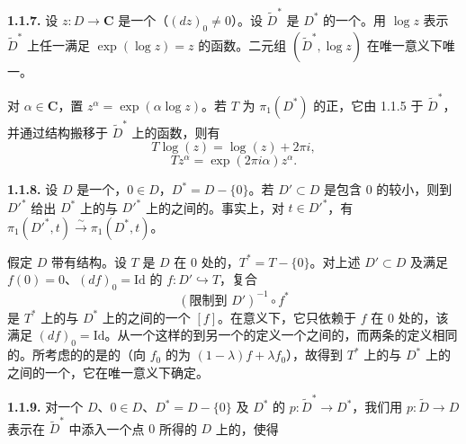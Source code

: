 \textbf{1.1.7.} 设 $z:D\to\mathbf C$ 是一个（$(dz)_0\ne0$）。设 $\widetilde D^*$ 是 $D^*$ 的一个。用 $\log z$ 表示 $\widetilde D^*$ 上任一满足
$\exp(\log z)=z$ 的函数。二元组 $(\widetilde D^*,\log z)$ 在唯一意义下唯一。

对 $\alpha\in\mathbf C$，置 $z^\alpha=\exp(\alpha\log z)$。若 $T$ 为 $\pi_1(D^*)$ 的正，它由 1.1.5 于 $\widetilde D^*$，并通过结构搬移于 $\widetilde D^*$ 上的函数，则有
\[
 T\log(z)=\log(z)+2\pi i,\tag{1.1.7.1}
\]
\[
 Tz^\alpha=\exp(2\pi i\alpha)z^\alpha.\tag{1.1.7.2}
\]

\textbf{1.1.8.} 设 $D$ 是一个，$0\in D$，$D^*=D-\{0\}$。若 $D'\subset D$ 是包含 $0$ 的较小，则到 $D'^*$ 给出 $D^*$ 上的与 $D'^*$ 上的之间的。事实上，对 $t\in D'^*$，有 $\pi_1(D'^*,t)\xrightarrow{\sim}\pi_1(D^*,t)$。

假定 $D$ 带有结构。设 $T$ 是 $D$ 在 $0$ 处的，$T^*=T-\{0\}$。对上述 $D'\subset D$ 及满足 $f(0)=0$、$(df)_0=\mathrm{Id}$ 的 $f:D'\hookrightarrow T$，复合
\[
 (\text{限制到 }D')^{-1}\circ f^*
\]
是 $T^*$ 上的与 $D^*$ 上的之间的一个 $[f]$。在意义下，它只依赖于 $f$ 在 $0$ 处的，该满足 $(df)_0=\mathrm{Id}$。从一个这样的到另一个的定义一个之间的，而两条的定义相同的。所考虑的的是的（向 $f_0$ 的为 $(1-\lambda)f+\lambda f_0$），故得到 $T^*$ 上的与 $D^*$ 上的之间的一个，它在唯一意义下确定。

\textbf{1.1.9.} 对一个 $D$、$0\in D$、$D^*=D-\{0\}$ 及 $D^*$ 的 $p:\widetilde D^*\to D^*$，我们用 $p:\widetilde D\to D$ 表示在 $\widetilde D^*$ 中添入一个点 $0$ 所得的 $D$ 上的，使得

